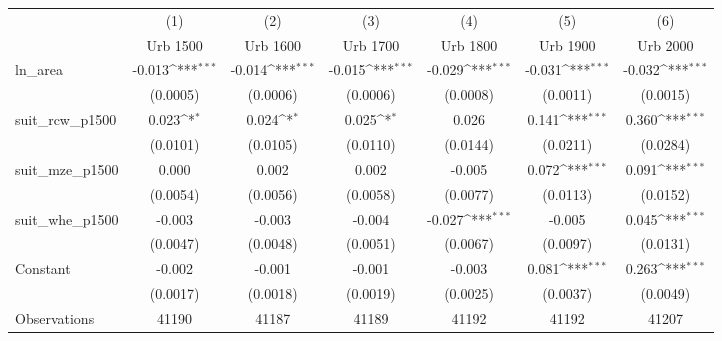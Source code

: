 {
\def\sym#1{\ifmmode^{#1}\else\(^{#1}\)\fi}
\begin{tabular}{l*{6}{c}}
\toprule
                    &\multicolumn{1}{c}{(1)}&\multicolumn{1}{c}{(2)}&\multicolumn{1}{c}{(3)}&\multicolumn{1}{c}{(4)}&\multicolumn{1}{c}{(5)}&\multicolumn{1}{c}{(6)}\\
                    &\multicolumn{1}{c}{Urb 1500}&\multicolumn{1}{c}{Urb 1600}&\multicolumn{1}{c}{Urb 1700}&\multicolumn{1}{c}{Urb 1800}&\multicolumn{1}{c}{Urb 1900}&\multicolumn{1}{c}{Urb 2000}\\
\midrule
ln\_area             &      -0.013\sym{***}&      -0.014\sym{***}&      -0.015\sym{***}&      -0.029\sym{***}&      -0.031\sym{***}&      -0.032\sym{***}\\
                    &    (0.0005)         &    (0.0006)         &    (0.0006)         &    (0.0008)         &    (0.0011)         &    (0.0015)         \\
\addlinespace
suit\_rcw\_p1500      &       0.023\sym{*}  &       0.024\sym{*}  &       0.025\sym{*}  &       0.026         &       0.141\sym{***}&       0.360\sym{***}\\
                    &    (0.0101)         &    (0.0105)         &    (0.0110)         &    (0.0144)         &    (0.0211)         &    (0.0284)         \\
\addlinespace
suit\_mze\_p1500      &       0.000         &       0.002         &       0.002         &      -0.005         &       0.072\sym{***}&       0.091\sym{***}\\
                    &    (0.0054)         &    (0.0056)         &    (0.0058)         &    (0.0077)         &    (0.0113)         &    (0.0152)         \\
\addlinespace
suit\_whe\_p1500      &      -0.003         &      -0.003         &      -0.004         &      -0.027\sym{***}&      -0.005         &       0.045\sym{***}\\
                    &    (0.0047)         &    (0.0048)         &    (0.0051)         &    (0.0067)         &    (0.0097)         &    (0.0131)         \\
\addlinespace
Constant            &      -0.002         &      -0.001         &      -0.001         &      -0.003         &       0.081\sym{***}&       0.263\sym{***}\\
                    &    (0.0017)         &    (0.0018)         &    (0.0019)         &    (0.0025)         &    (0.0037)         &    (0.0049)         \\
\midrule
Observations        &       41190         &       41187         &       41189         &       41192         &       41192         &       41207         \\

\end{tabular}}

